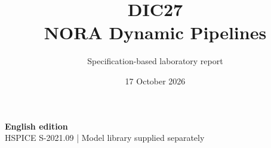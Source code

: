 \documentclass[11pt,a4paper]{article}
\title{\color{accent}DIC27\\[4pt]NORA Dynamic Pipelines}
\author{Specification-based laboratory report}
\date{17 October 2026}
\begin{document}
\maketitle
\begin{center}\small\textbf{English edition}\\
HSPICE S-2021.09 \quad | \quad Model library supplied separately
\end{center}


\end{document}
